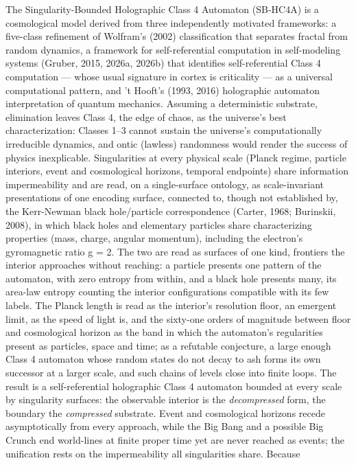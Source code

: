 \documentclass[
]{article}
\begin{document}
The Singularity-Bounded Holographic Class 4 Automaton (SB-HC4A) is a
cosmological model derived from three independently motivated
frameworks: a five-class refinement of Wolfram's (2002) classification
that separates fractal from random dynamics, a framework for
self-referential computation in self-modeling systems (Gruber, 2015,
2026a, 2026b) that identifies self-referential Class 4 computation ---
whose usual signature in cortex is criticality --- as a universal
computational pattern, and 't Hooft's (1993, 2016) holographic automaton
interpretation of quantum mechanics. Assuming a deterministic substrate,
elimination leaves Class 4, the edge of chaos, as the universe's best
characterization: Classes 1--3 cannot sustain the universe's
computationally irreducible dynamics, and ontic (lawless) randomness
would render the success of physics inexplicable. Singularities at every
physical scale (Planck regime, particle interiors, event and
cosmological horizons, temporal endpoints) share information
impermeability and are read, on a single-surface ontology, as
scale-invariant presentations of one encoding surface, connected to,
though not established by, the Kerr-Newman black hole/particle
correspondence (Carter, 1968; Burinskii, 2008), in which black holes and
elementary particles share characterizing properties (mass, charge,
angular momentum), including the electron's gyromagnetic ratio g = 2.
The two are read as surfaces of one kind, frontiers the interior
approaches without reaching: a particle presents one pattern of the
automaton, with zero entropy from within, and a black hole presents
many, its area-law entropy counting the interior configurations
compatible with its few labels. The Planck length is read as the
interior's resolution floor, an emergent limit, as the speed of light
is, and the sixty-one orders of magnitude between floor and cosmological
horizon as the band in which the automaton's regularities present as
particles, space and time; as a refutable conjecture, a large enough
Class 4 automaton whose random states do not decay to ash forms its own
successor at a larger scale, and such chains of levels close into finite
loops. The result is a self-referential holographic Class 4 automaton
bounded at every scale by singularity surfaces: the observable interior
is the \emph{decompressed} form, the boundary the \emph{compressed}
substrate. Event and cosmological horizons recede asymptotically from
every approach, while the Big Bang and a possible Big Crunch end
world-lines at finite proper time yet are never reached as events; the
unification rests on the impermeability all singularities share. Because
\end{document}
